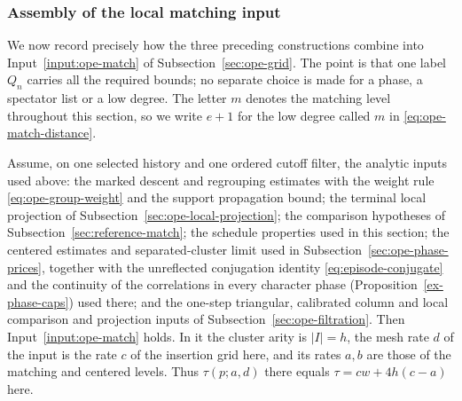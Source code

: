 \subsubsection{Assembly of the local matching input}
We now record precisely how the three preceding constructions combine
into Input~\ref{input:ope-match} of Subsection~\ref{sec:ope-grid}. The
point is that one label $Q_n$ carries all the required bounds; no
separate choice is made for a phase, a spectator list or a low degree.
The letter $m$ denotes the matching level throughout this section, so we
write $e+1$ for the low degree called $m$ in \eqref{eq:ope-match-distance}.

\begin{proposition}\label{prop:ope-match-assembly}
Assume, on one selected history and one ordered cutoff filter, the
analytic inputs used above: the marked descent and regrouping estimates
with the weight rule \eqref{eq:ope-group-weight} and the support
propagation bound; the terminal local projection of
Subsection~\ref{sec:ope-local-projection}; the comparison hypotheses of
Subsection~\ref{sec:reference-match}; the schedule properties used in
this section; the centered estimates and separated-cluster limit used in
Subsection~\ref{sec:ope-phase-prices}, together with the unreflected
conjugation identity \eqref{eq:episode-conjugate} and the continuity of
the correlations in every character phase
(Proposition~\ref{ex-phase-caps}) used there; and the one-step triangular,
calibrated column and local comparison and projection inputs of
Subsection~\ref{sec:ope-filtration}. Then Input~\ref{input:ope-match} holds.
In it the cluster arity is $|I|=h$, the mesh rate $d$ of the input is
the rate $c$ of the insertion grid here, and its rates $a,b$ are those
of the matching and centered levels. Thus $\tau(p;a,d)$ there equals
$\tau=cw+4h(c-a)$ here.
\end{proposition}

